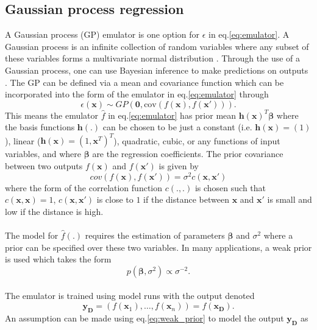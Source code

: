 \documentclass{article}
\newcommand{\simulator}{f}
\newcommand{\emulator}{\hat{f}}
\newcommand{\inputVec}{\mathbf{x}}
\newcommand{\outputVec}{\mathbf{y}}
\newcommand{\basisFuncs}{\mathbf{h}}
\newcommand{\basisCoeffs}{\mathbf{\beta}}
\newcommand{\cov}{cov}
\newcommand{\var}{\sigma^2}
\newcommand{\prior}{p}
\newcommand{\corr}{c}
\newcommand{\designInput}{\inputVec_\design}
\newcommand{\designOutput}{\outputVec_\design}
\newcommand{\design}{\mathbf{D}}
\newcommand{\numDPs}{n}
\newcommand{\residual}{\epsilon}
\newcommand{\GP}{GP}
\newcommand{\SD}{\sigma}
\begin{document}
\subsection{Gaussian process regression}
\label{section:GPs}
A Gaussian process (GP) emulator is one option for $\residual$ in eq.\eqref{eq:emulator}. A Gaussian process is an infinite collection of random variables where any subset of these variables forms a multivariate normal distribution \citep{Currin1991}. Through the use of a Gaussian process, one can use Bayesian inference to make predictions on outputs \citep{Currin1991,OHagan2006,Kennedy2001,Oakley2002}. The GP can be defined via a mean and covariance function which can be incorporated into the form of the emulator in eq.\eqref{eq:emulator} through 
\begin{equation}
    \nonumber
    \residual(\inputVec) \sim \GP(\mathbf{0},\text{\cov}(\simulator(\inputVec),\simulator(\inputVec'))).
\end{equation}
This means the emulator $\emulator$ in eq.\eqref{eq:emulator} has prior mean $\basisFuncs (\inputVec)^T \basisCoeffs$ where the basis functions $\basisFuncs(.)$ can be chosen to be just a constant (i.e. $\basisFuncs (\inputVec) = (1)$), linear ($\basisFuncs (\inputVec) = (1,\inputVec^T)^T$), quadratic, cubic, or any functions of input variables, and where $\basisCoeffs$ are the regression coefficients. The prior covariance between two outputs $\simulator(\inputVec)$ and $\simulator(\inputVec')$ is given by
\begin{equation}
    \label{eq:cov_corr_func}
    \cov(\simulator(\inputVec),\simulator(\inputVec')) = \var \corr(\inputVec,\inputVec')
\end{equation}
where the form of the correlation function $\corr(.,.)$ is chosen such that $\corr(\inputVec,\inputVec) = 1$, $\corr(\inputVec,\inputVec')$ is close to $1$ if the distance between $\inputVec$ and $\inputVec'$ is small and low if the distance is high.\\\\
The model for $\emulator(.)$ requires the estimation of parameters $\basisCoeffs$ and $\var$ where a prior can be specified over these two variables. In many applications, a weak prior is used which takes the form
\begin{equation}
    \label{eq:weak_prior}
    \prior(\basisCoeffs,\var) \propto \SD^{-2}.
\end{equation}
\\
The emulator is trained using model runs with the output denoted \[\designOutput = \left(\simulator(\inputVec_1),\dots,\simulator(\inputVec_\numDPs)\right) = \simulator(\designInput).\] An assumption can be made using eq.\eqref{eq:weak_prior} to model the output $\designOutput$ as
\end{document}
